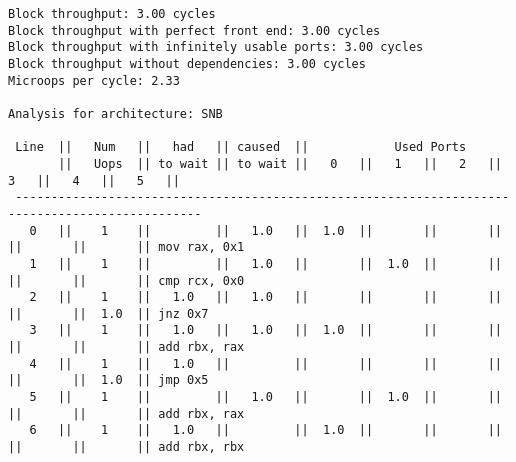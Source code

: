 \documentclass[a4paper,12pt,titlepage, twoside]{report}
\begin{document}
\begin{mdframed}[backgroundcolor=light-gray, roundcorner=10pt,leftmargin=1, rightmargin=1, innerleftmargin=15, innertopmargin=15,innerbottommargin=15, outerlinewidth=1, linecolor=light-gray]
\begin{center}
\begin{BVerbatim}[fontsize=\tiny]
Block throughput: 3.00 cycles
Block throughput with perfect front end: 3.00 cycles
Block throughput with infinitely usable ports: 3.00 cycles
Block throughput without dependencies: 3.00 cycles
Microops per cycle: 2.33

Analysis for architecture: SNB

 Line  ||   Num   ||   had   || caused  ||            Used Ports
       ||   Uops  || to wait || to wait ||   0   ||   1   ||   2   ||   3   ||   4   ||   5   ||
 ------------------------------------------------------------------------------------------------
   0   ||    1    ||         ||   1.0   ||  1.0  ||       ||       ||       ||       ||       || mov rax, 0x1
   1   ||    1    ||         ||   1.0   ||       ||  1.0  ||       ||       ||       ||       || cmp rcx, 0x0
   2   ||    1    ||   1.0   ||   1.0   ||       ||       ||       ||       ||       ||  1.0  || jnz 0x7
   3   ||    1    ||   1.0   ||   1.0   ||  1.0  ||       ||       ||       ||       ||       || add rbx, rax
   4   ||    1    ||   1.0   ||         ||       ||       ||       ||       ||       ||  1.0  || jmp 0x5
   5   ||    1    ||         ||   1.0   ||       ||  1.0  ||       ||       ||       ||       || add rbx, rax
   6   ||    1    ||   1.0   ||         ||  1.0  ||       ||       ||       ||       ||       || add rbx, rbx
\end{BVerbatim}
\end{center}
\end{mdframed}
\end{document}
